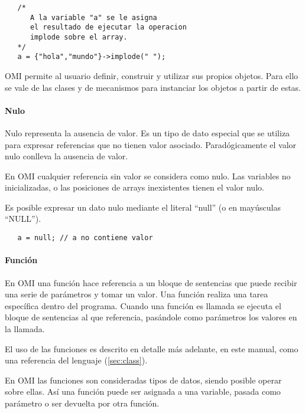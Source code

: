 \begin{lstlisting}
   /*
      A la variable "a" se le asigna
      el resultado de ejecutar la operacion 
      implode sobre el array. 
   */
   a = {"hola","mundo"}->implode(" ");
\end{lstlisting} 

OMI permite al usuario definir, construir y utilizar sus propios objetos. Para ello se vale de las clases
y de mecanismos para instanciar los objetos a partir de estas.


\paragraph{Nulo}
Nulo representa la ausencia de valor. Es un tipo de dato especial que se utiliza para expresar referencias que no tienen valor asociado. Paradógicamente el
valor nulo conlleva la ausencia de valor. 

En OMI cualquier referencia sin valor se considera como nulo. Las variables no inicializadas, o las posiciones de arrays inexistentes tienen el valor nulo. 

Es posible expresar un dato nulo mediante el literal ``null'' (o en mayúsculas ``NULL''). \\

\begin{lstlisting}
   a = null; // a no contiene valor
\end{lstlisting} 

\paragraph{Función}\label{sec:type_func}
En OMI una función hace referencia a un bloque de sentencias que puede recibir una serie de parámetros y tomar un valor. Una función realiza una tarea específica dentro del programa.
Cuando una función es llamada se ejecuta el bloque de sentencias al que referencia, pasándole como parámetros los valores en la llamada. 

El uso de las funciones es descrito en detalle más adelante, en este manual, como una referencia del lenguaje (\autoref{sec:class}). 

En OMI las funciones son consideradas tipos de datos, siendo posible operar sobre ellas. Así una función puede ser asignada a una variable, pasada como parámetro 
o ser devuelta por otra función. \\

